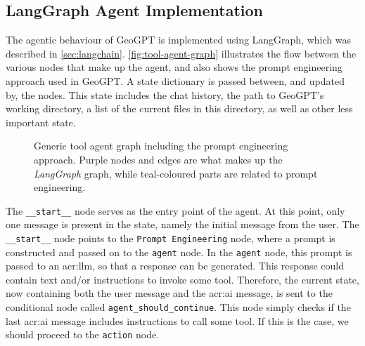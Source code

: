 \subsection{LangGraph Agent Implementation}
\label{subsec:lg-agent-implementation}

The agentic behaviour of GeoGPT is implemented using LangGraph, which was described in \autoref{sec:langchain}. \autoref{fig:tool-agent-graph} illustrates the flow between the various nodes that make up the agent, and also shows the prompt engineering approach used in GeoGPT. A state dictionary is passed between, and updated by, the nodes. This state includes the chat history, the path to GeoGPT's working directory, a list of the current files in this directory, as well as other less important state.


\begin{figure}
    \centering
    \caption[Generic tool agent graph including the prompt engineering approach]{Generic tool agent graph including the prompt engineering approach. Purple nodes and edges are what makes up the \textit{LangGraph} graph, while teal-coloured parts are related to prompt engineering.}
    \label{fig:tool-agent-graph}
\end{figure}

The \texttt{\_\_start\_\_} node serves as the entry point of the agent. At this point, only one message is present in the state, namely the initial message from the user. The \texttt{\_\_start\_\_} node points to the \texttt{Prompt Engineering} node, where a prompt is constructed and passed on to the \texttt{agent} node. In the \texttt{agent} node, this prompt is passed to an \acrshort{acr:llm}, so that a response can be generated. This response could contain text and/or instructions to invoke some tool. Therefore, the current state, now containing both the user message and the \acrshort{acr:ai} message, is sent to the conditional node called \texttt{agent\_should\_continue}. This node simply checks if the last \acrshort{acr:ai} message includes instructions to call some tool. If this is the case, we should proceed to the \texttt{action} node.

